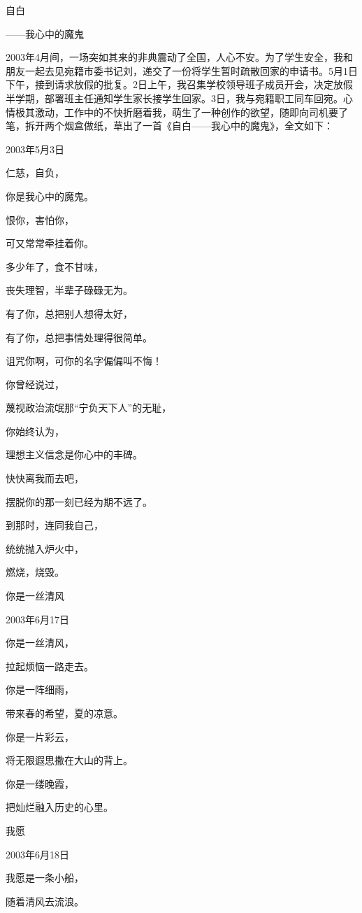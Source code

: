 \documentclass[../../dazhuan.tex]{subfiles}
\begin{document}
自白

——我心中的魔鬼

2003年4月间，一场突如其来的非典震动了全国，人心不安。为了学生安全，我和朋友一起去见宛籍市委书记刘，递交了一份将学生暂时疏散回家的申请书。5月1日下午，接到请求放假的批复。2日上午，我召集学校领导班子成员开会，决定放假半学期，部署班主任通知学生家长接学生回家。3日，我与宛籍职工同车回宛。心情极其激动，工作中的不快折磨着我，萌生了一种创作的欲望，随即向司机要了笔，拆开两个烟盒做纸，草出了一首《自白——我心中的魔鬼》，全文如下：

2003年5月3日

仁慈，自负，

你是我心中的魔鬼。

恨你，害怕你，

可又常常牵挂着你。

多少年了，食不甘味，

丧失理智，半辈子碌碌无为。

有了你，总把别人想得太好，

有了你，总把事情处理得很简单。

诅咒你啊，可你的名字偏偏叫不悔！

你曾经说过，

蔑视政治流氓那“宁负天下人”的无耻，

你始终认为，

理想主义信念是你心中的丰碑。

快快离我而去吧，

摆脱你的那一刻已经为期不远了。

到那时，连同我自己，

统统抛入炉火中，

燃烧，烧毁。



你是一丝清风

2003年6月17日

你是一丝清风，

拉起烦恼一路走去。

你是一阵细雨，

带来春的希望，夏的凉意。

你是一片彩云，

将无限遐思撒在大山的背上。

你是一缕晚霞，

把灿烂融入历史的心里。



我愿

2003年6月18日

我愿是一条小船，

随着清风去流浪。
\end{document}
